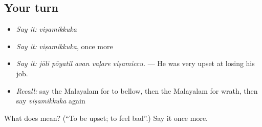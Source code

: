 \subsection*{Your turn}
\begin{itemize}
\raggedright
  \item \emph{Say it:} \emph{viṣamikkuka}
  \item \emph{Say it:} \emph{viṣamikkuka}, once more
  \item \emph{Say it:} \emph{jōli pōyatil avan vaḷare viṣamiccu.} — He was very upset at losing his job.
  \item \emph{Recall:} say the Malayalam for to bellow, then the Malayalam for wrath, then say \emph{viṣamikkuka} again
\end{itemize}

\begin{tcolorbox}[breakable,colback=teal!4,colframe=teal!35!black,title={Before you move on}]
What does  mean? (\textquotedblleft{}To be upset; to feel bad\textquotedblright{}.) Say it once more.
\end{tcolorbox}
